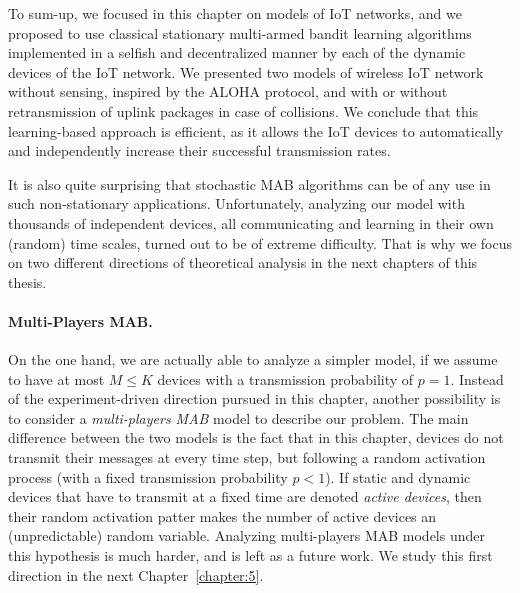 
To sum-up, we focused in this chapter on models of IoT networks, and we proposed to use classical stationary multi-armed bandit learning algorithms implemented in a selfish and decentralized manner by each of the dynamic devices of the IoT network.
We presented two models of wireless IoT network without sensing, inspired by the ALOHA protocol, and with or without retransmission of uplink packages in case of collisions.
%
We conclude that this learning-based approach is efficient, as it allows the IoT devices to automatically and independently increase their successful transmission rates.

It is also quite surprising that stochastic MAB algorithms can be of any use in such non-stationary applications.
Unfortunately, analyzing our model with thousands of independent devices, all communicating and learning in their own (random) time scales, turned out to be of extreme difficulty.
That is why we focus on two different directions of theoretical analysis in the next chapters of this thesis.


\paragraph{Multi-Players MAB.}
%
On the one hand, we are actually able to analyze a simpler model, if we assume to have at most $M \leq K$ devices with a transmission probability of $p=1$.
Instead of the experiment-driven direction pursued in this chapter, another possibility is to consider a \emph{multi-players MAB} model to describe our problem.
%
The main difference between the two models is the fact that in this chapter, devices do not transmit their messages at every time step, but following a random activation process (with a fixed transmission probability $p < 1$).
If static and dynamic devices that have to transmit at a fixed time are denoted \emph{active devices},
then their random activation patter makes the number of active devices an (unpredictable) random variable.
Analyzing multi-players MAB models under this hypothesis is much harder, and is left as a future work.
%
We study this first direction in the next Chapter~\ref{chapter:5}.

